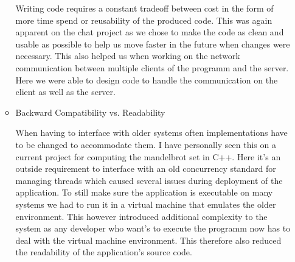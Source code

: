 \documentclass[a4paper, 10pt]{article}
\begin{document}
\begin{enumerate}
\begin{itemize}
        Writing code requires a constant tradeoff between cost in the form of more time spend or reusability of the produced code.
        This was again apparent on the chat project as we chose to make the code as clean and usable as possible to help us move faster in 
        the future when changes were necessary. This also helped us when working on the network communication between multiple clients of the
        programm and the server. Here we were able to design code to handle the communication on the client as well as the 
        server.
        \item Backward Compatibility vs. Readability

        When having to interface with older systems often implementations have to be changed to accommodate them.
        I have personally seen this on a current project for computing the mandelbrot set in C++. Here it's an outside requirement to 
        interface with an old concurrency standard for managing threads which caused several issues during deployment of the application. 
        To still make sure the application is executable on many systems we had to run it in a virtual machine that emulates the older
        environment. This however introduced additional complexity to the system as any developer who want's to execute the programm now 
        has to deal with the virtual machine environment. This therefore also reduced the readability of the application's source code.
    \end{itemize}
\end{enumerate}
\end{document}
